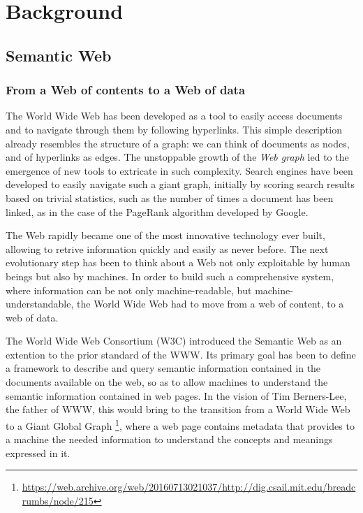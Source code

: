 \documentclass[%
    corpo=13.5pt,
    twoside,
    oldstyle,
    tipotesi=magistrale,
    greek,
    evenboxes
]{toptesi}
\begin{document}
\chapter{Background}

\section{Semantic Web}

\subsection{From a Web of contents to a Web of data}

The World Wide Web has been developed as a tool to easily access
documents and to navigate through them by following hyperlinks.
This simple description already resembles the structure of a graph: we can
think of documents as nodes, and of hyperlinks as edges. The unstoppable growth
of the \emph{Web graph} led to the emergence of new tools to extricate in such
complexity. Search engines have been developed to easily navigate such a giant
graph, initially by scoring search results based on trivial statistics, such
as the number of times a document has been linked, as in the case of the
PageRank \cite{page1999} algorithm developed by Google.
\newline

The Web rapidly became one of the most innovative technology ever built,
allowing to retrive information quickly and easily as never before.
The next evolutionary step has been to think about a Web not only exploitable by
human beings but also by machines. In order to build such a comprehensive
system, where information can be not only machine-readable, but
machine-understandable, the World Wide Web had to move from a web of content, to
a web of data.
\newline

The World Wide Web Consortium (W3C) introduced the Semantic Web as an extention
to the prior standard of the WWW. Its primary goal has been
to define a framework to describe and query semantic information contained
in the documents available on the web, so as to allow machines to understand
the semantic information contained in web pages. In the vision of Tim
Berners-Lee, the father of WWW, this would bring to the transition from a
World Wide Web to a Giant Global Graph
\footnote{\url{https://web.archive.org/web/20160713021037/http://dig.csail.mit.edu/breadcrumbs/node/215}},
where a web page contains metadata that provides to a machine the needed
information to understand the concepts and meanings expressed in it.
\end{document}
